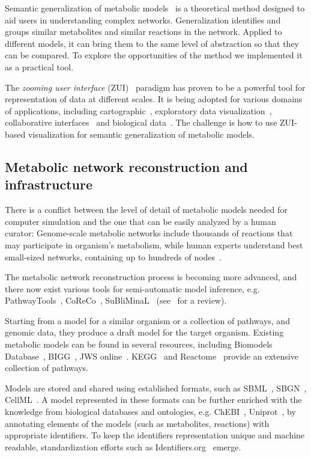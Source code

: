 \documentclass{bmcart}
\begin{document}
Semantic generalization of metabolic models~\cite{Zhukova2014} is a theoretical method designed to aid users in understanding complex networks. Generalization identifies and groups similar metabolites and similar reactions in the network.
Applied to different models, it can bring them to the same level of abstraction so that they can be compared.
To explore the opportunities of the method we implemented it as a practical tool.

The \emph{zooming user interface} (ZUI)~\cite{Bederson1998} paradigm has proven to be a powerful tool for representation of data at different scales. It is being adopted for various domains of applications, including cartographic~\cite{Nivala2008}, exploratory data visualization~\cite{Roberts2005}, collaborative interfaces~\cite{Laufer2011} and biological data~\cite{Pook1998, Hu2007}. The challenge is how to use ZUI-based visualization for semantic generalization of metabolic models.

\subsection*{Metabolic network reconstruction and infrastructure}
There is a conflict between the level of detail of metabolic models needed for computer simulation and the one that can be easily analyzed by a human curator: Genome-scale metabolic networks include thousands of reactions that may participate in organism's metabolism, while human experts understand best small-sized networks, containing up to hundreds of nodes~\cite{VonLandesberger2011,Herman2000}.

The metabolic network reconstruction process is becoming more advanced, and there now exist various tools for semi-automatic model inference, e.g. PathwayTools~\cite{Karp2002}, CoReCo~\cite{Pitkanen2014}, SuBliMinaL~\cite{Swainston2011} (see~\cite{Hamilton2014} for a review).

Starting from a model for a similar organism or a collection of pathways, and genomic data, they produce a draft model for the target organism. Existing metabolic models can be found in several resources, including Biomodels Database~\cite{Li10}, BIGG~\cite{Schellenberger2010}, JWS online~\cite{Snoep2003}. KEGG~\cite{Kanehisa12} and Reactome~\cite{Milacic2012, Croft2013} provide an extensive collection of pathways. 

Models are stored and shared using established formats, such as SBML~\cite{Hucka2003}, SBGN~\cite{LeNovere2009}, CellML~\cite{Lloyd2004}. A model represented in these formats can be further enriched with the knowledge from biological databases and ontologies, e.g. ChEBI~\cite{deMatos10}, Uniprot~\cite{TheUniProtConsortium2014}, by annotating elements of the models (such as metabolites, reactions) with appropriate identifiers. To keep the identifiers representation unique and machine readable, standardization efforts such as Identifiers.org~\cite{Juty2012} emerge.
\end{document}
